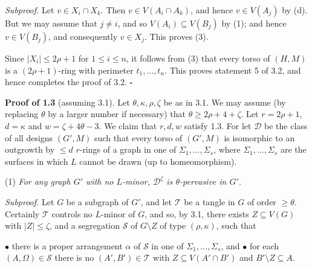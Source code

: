\textit{Subproof.} Let $v \in X_i \cap X_k$. Then $v \in V(A_i \cap A_k)$, and hence $v \in V(A_j)$ by (d). But we may assume that $j \ne i$, and so $V(A_i) \subseteq V(B_j)$ by (1); and hence $v \in V(B_j)$, and consequently $v \in X_j$. This proves (3).

Since $|X_i| \le 2\rho + 1$ for $1 \le i \le n$, it follows from (3) that every torso of $(H, M)$ is a $(2\rho + 1)$-ring with perimeter $t_1, \dots, t_n$. This proves statement 5 of 3.2, and hence completes the proof of 3.2. $\square$

\textbf{Proof of 1.3} (assuming 3.1). Let $\theta, \kappa, \rho, \zeta$ be as in 3.1. We may assume (by replacing $\theta$ by a larger number if necessary) that $\theta \ge 2\rho + 4 + \zeta$. Let $r = 2\rho + 1$, $d = \kappa$ and $w = \zeta + 4\theta - 3$. We claim that $r, d, w$ satisfy 1.3. For let $\mathcal{D}$ be the class of all designs $(G', M)$ such that every torso of $(G', M)$ is isomorphic to an outgrowth by $\le d$ $r$-rings of a graph in one of $\Sigma_1, \dots, \Sigma_s$, where $\Sigma_1, \dots, \Sigma_s$ are the surfaces in which $L$ cannot be drawn (up to homeomorphism).

\hspace*{12pt}(1) \textit{For any graph $G'$ with no $L$-minor, $\mathcal{D}^\zeta$ is $\theta$-pervasive in $G'$.}

\textit{Subproof.} Let $G$ be a subgraph of $G'$, and let $\mathscr{T}$ be a tangle in $G$ of order $\ge \theta$. Certainly $\mathscr{T}$ controls no $L$-minor of $G$, and so, by 3.1, there exists $Z \subseteq V(G)$ with $|Z| \le \zeta$, and a segregation $\mathcal{S}$ of $G \setminus Z$ of type $(\rho, \kappa)$, such that

\hspace*{12pt}$\bullet$ there is a proper arrangement $\alpha$ of $\mathcal{S}$ in one of $\Sigma_1, \dots, \Sigma_s$, and $\bullet$ for each $(A, \Omega) \in \mathcal{S}$ there is no $(A', B') \in \mathscr{T}$ with $Z \subseteq V(A' \cap B')$ and $B' \setminus Z \subseteq A$.

